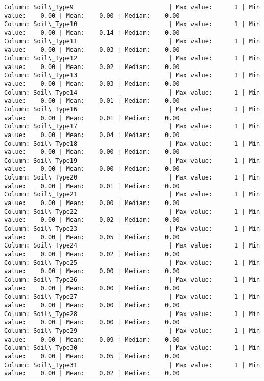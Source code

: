 \documentclass[11pt]{article}
\begin{document}
\begin{Verbatim}[commandchars=\\\{\}]
Column: Soil\_Type9                          | Max value:      1 | Min value:    0.00 | Mean:    0.00 | Median:    0.00
Column: Soil\_Type10                         | Max value:      1 | Min value:    0.00 | Mean:    0.14 | Median:    0.00
Column: Soil\_Type11                         | Max value:      1 | Min value:    0.00 | Mean:    0.03 | Median:    0.00
Column: Soil\_Type12                         | Max value:      1 | Min value:    0.00 | Mean:    0.02 | Median:    0.00
Column: Soil\_Type13                         | Max value:      1 | Min value:    0.00 | Mean:    0.03 | Median:    0.00
Column: Soil\_Type14                         | Max value:      1 | Min value:    0.00 | Mean:    0.01 | Median:    0.00
Column: Soil\_Type16                         | Max value:      1 | Min value:    0.00 | Mean:    0.01 | Median:    0.00
Column: Soil\_Type17                         | Max value:      1 | Min value:    0.00 | Mean:    0.04 | Median:    0.00
Column: Soil\_Type18                         | Max value:      1 | Min value:    0.00 | Mean:    0.00 | Median:    0.00
Column: Soil\_Type19                         | Max value:      1 | Min value:    0.00 | Mean:    0.00 | Median:    0.00
Column: Soil\_Type20                         | Max value:      1 | Min value:    0.00 | Mean:    0.01 | Median:    0.00
Column: Soil\_Type21                         | Max value:      1 | Min value:    0.00 | Mean:    0.00 | Median:    0.00
Column: Soil\_Type22                         | Max value:      1 | Min value:    0.00 | Mean:    0.02 | Median:    0.00
Column: Soil\_Type23                         | Max value:      1 | Min value:    0.00 | Mean:    0.05 | Median:    0.00
Column: Soil\_Type24                         | Max value:      1 | Min value:    0.00 | Mean:    0.02 | Median:    0.00
Column: Soil\_Type25                         | Max value:      1 | Min value:    0.00 | Mean:    0.00 | Median:    0.00
Column: Soil\_Type26                         | Max value:      1 | Min value:    0.00 | Mean:    0.00 | Median:    0.00
Column: Soil\_Type27                         | Max value:      1 | Min value:    0.00 | Mean:    0.00 | Median:    0.00
Column: Soil\_Type28                         | Max value:      1 | Min value:    0.00 | Mean:    0.00 | Median:    0.00
Column: Soil\_Type29                         | Max value:      1 | Min value:    0.00 | Mean:    0.09 | Median:    0.00
Column: Soil\_Type30                         | Max value:      1 | Min value:    0.00 | Mean:    0.05 | Median:    0.00
Column: Soil\_Type31                         | Max value:      1 | Min value:    0.00 | Mean:    0.02 | Median:    0.00

\end{Verbatim}
\end{document}
